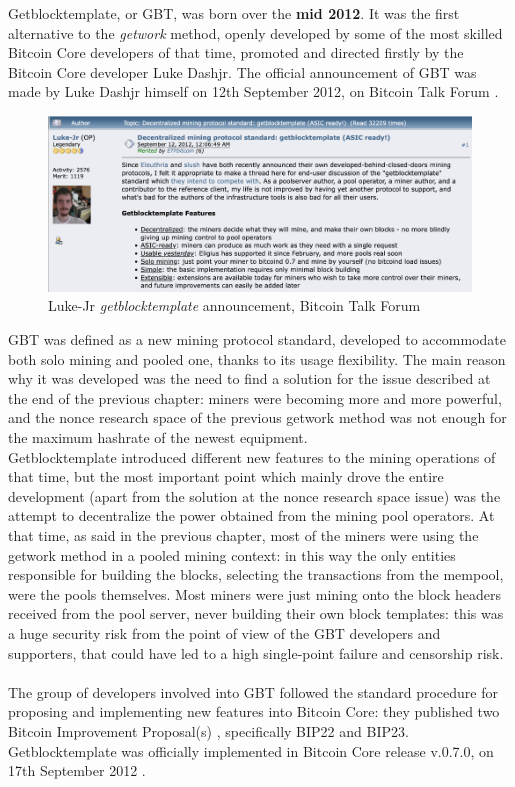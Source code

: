 Getblocktemplate, or GBT, was born over the \textbf{mid 2012}. 
It was the first alternative to the \textit{getwork} method, openly developed by some of the most skilled Bitcoin Core developers of that time, promoted and directed firstly by the Bitcoin Core developer Luke Dashjr. The official announcement of GBT was made by Luke Dashjr himself on 12th September 2012, on Bitcoin Talk Forum \cite{bitcointalkDecentralizedMining}.
\begin{figure}[h!]
    \centering
    \includegraphics[width=15cm]{Figures/gbt/gbt1.png}
    \caption{Luke-Jr \textit{getblocktemplate}  announcement, Bitcoin Talk Forum}
    \label{fig:gbt1}
\end{figure}
\newline
\noindent GBT was defined as a new mining protocol standard, developed to accommodate both solo mining and pooled one, thanks to its usage flexibility. 
The main reason why it was developed was the need to find a solution for the issue described at the end of the previous chapter: miners were becoming more and more powerful, and the nonce research space of the previous getwork method was not enough for the maximum hashrate of the newest equipment. \\
Getblocktemplate introduced different new features to the mining operations of that time, but the most important point which mainly drove the entire development (apart from the solution at the nonce research space issue) was the attempt to decentralize the power obtained from the mining pool operators. At that time, as said in the previous chapter, most of the miners were using the getwork method in a pooled mining context: in this way the only entities responsible for building the blocks, selecting the transactions from the mempool, were the pools themselves. Most miners were just mining onto the block headers received from the pool server, never building their own block templates: this was a huge security risk from the point of view of the GBT developers and supporters, that could have led to a high single-point failure and censorship risk. \\\\
The group of developers involved into GBT followed the standard procedure for proposing and implementing new features into Bitcoin Core: they published two Bitcoin Improvement Proposal(s) \cite{cointelegraphWhatBitcoin}, specifically BIP22 and BIP23.\\
Getblocktemplate was officially implemented in Bitcoin Core release v.0.7.0, on 17th September 2012 \cite{bitcoinBitcoinQtVersion}.

